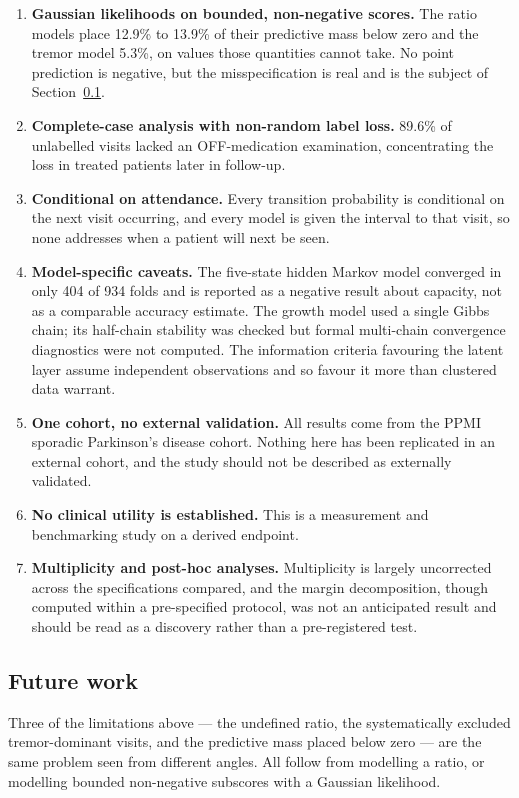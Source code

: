 \documentclass[11pt]{article}
\begin{document}
\begin{enumerate}
\item \textbf{Gaussian likelihoods on bounded, non-negative scores.} The ratio
models place 12.9\% to 13.9\% of their predictive mass below zero and the tremor
model 5.3\%, on values those quantities cannot take. No point prediction is
negative, but the misspecification is real and is the subject of
Section~\ref{sec:future}.

\item \textbf{Complete-case analysis with non-random label loss.} 89.6\% of
unlabelled visits lacked an OFF-medication examination, concentrating the loss
in treated patients later in follow-up.

\item \textbf{Conditional on attendance.} Every transition probability is
conditional on the next visit occurring, and every model is given the interval
to that visit, so none addresses when a patient will next be seen.

\item \textbf{Model-specific caveats.} The five-state hidden Markov model
converged in only 404 of 934 folds and is reported as a negative result about
capacity, not as a comparable accuracy estimate. The growth model used a single
Gibbs chain; its half-chain stability was checked but formal multi-chain
convergence diagnostics were not computed. The information criteria favouring
the latent layer assume independent observations and so favour it more than
clustered data warrant.

\item \textbf{One cohort, no external validation.} All results come from the
PPMI sporadic Parkinson's disease cohort. Nothing here has been replicated in an
external cohort, and the study should not be described as externally validated.

\item \textbf{No clinical utility is established.} This is a measurement and
benchmarking study on a derived endpoint.

\item \textbf{Multiplicity and post-hoc analyses.} Multiplicity is largely
uncorrected across the specifications compared, and the margin decomposition,
though computed within a pre-specified protocol, was not an anticipated result
and should be read as a discovery rather than a pre-registered test.
\end{enumerate}

\subsection{Future work}
\label{sec:future}
Three of the limitations above --- the undefined ratio, the systematically
excluded tremor-dominant visits, and the predictive mass placed below zero ---
are the same problem seen from different angles. All follow from modelling a
ratio, or modelling bounded non-negative subscores with a Gaussian likelihood.
\end{document}

